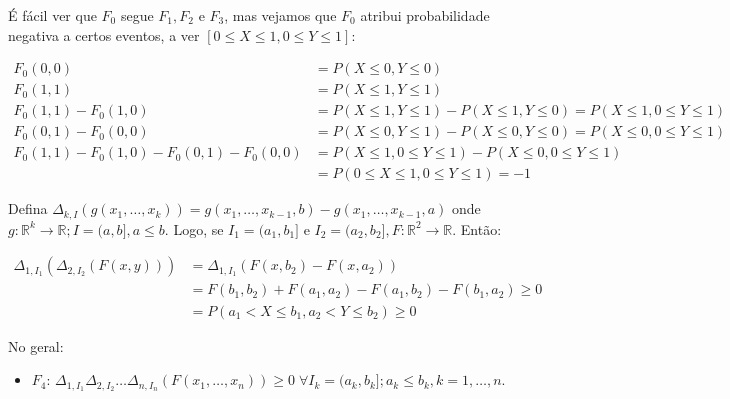 \documentclass[
]{article}
\providecommand{\tightlist}{%
  \setlength{\itemsep}{0pt}\setlength{\parskip}{0pt}}
\theoremstyle{definition}
\theoremstyle{definition}
\theoremstyle{definition}
\theoremstyle{definition}
\theoremstyle{remark}
\begin{document}
É fácil ver que \(F_{0}\) segue \(F_{1}, F_{2}\) e \(F_{3}\), mas vejamos que \(F_{0}\) atribui probabilidade negativa a certos eventos, a ver \([0 \le X \le 1, 0 \le Y \le 1]\):

\begin{align*}
F_{0}(0,0) &= P(X \le 0, Y \le 0) \\
F_{0}(1,1) &= P(X \le 1, Y \le 1) \\
F_{0}(1,1) - F_{0}(1,0) &= P(X \le 1, Y \le 1) - P(X \le 1, Y \le 0) = P(X \le 1, 0 \le Y \le 1)\\
F_{0}(0,1) - F_{0}(0,0) &= P(X \le 0, Y \le 1) - P(X \le 0, Y \le 0) = P(X \le 0, 0 \le Y \le 1)\\
F_{0}(1,1) - F_{0}(1,0) - F_{0}(0,1) - F_{0}(0,0) &= P(X \le 1, 0 \le Y \le 1) - P(X \le 0, 0 \le Y \le 1) \\
&= P(0 \le X \le 1, 0 \le Y \le 1) = -1
\end{align*}

Defina \(\Delta_{k,I}(g(x_{1},\ldots,x_{k})) = g(x_{1}, \ldots, x_{k-1},b) - g(x_{1}, \ldots, x_{k-1},a)\) onde \(g:\mathbb{R}^{k} \to \mathbb{R}; I = (a,b], a \le b\). Logo, se \(I_{1} = (a_{1},b_{1}]\) e \(I_{2} = (a_{2},b_{2}], F:\mathbb{R}^{2} \to \mathbb{R}\). Então:

\begin{align*}
\Delta_{1,I_{1}}(\Delta_{2,I_{2}}(F(x,y))) &= \Delta_{1,I_{1}}(F(x, b_{2}) - F(x, a_{2})) \\
&= F(b_{1}, b_{2}) + F(a_{1}, a_{2}) - F(a_{1}, b_{2}) - F(b_{1}, a_{2}) \ge 0 \\
&= P(a_{1} < X \le b_{1}, a_{2} < Y \le b_{2}) \ge 0
\end{align*}

No geral:

\begin{itemize}
\tightlist
\item
  \(F_{4}\): \(\Delta_{1,I_{1}}\Delta_{2,I_{2}}\ldots\Delta_{n,I_{n}}(F(x_{1},\ldots,x_{n})) \ge 0 \; \forall I_{k} = (a_{k}, b_{k}]; a_{k} \le b_{k}, k=1,\ldots,n\).
\end{itemize}
\end{document}
